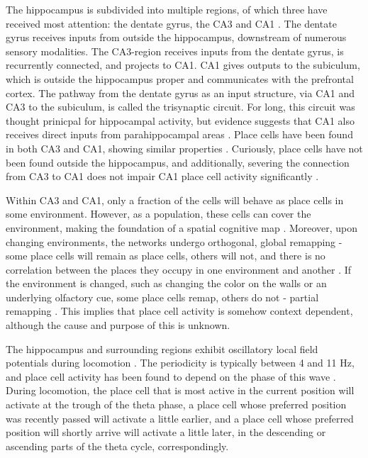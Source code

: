 \documentclass{article}
\begin{document}
    The hippocampus is subdivided into multiple regions, of which three have received most attention: the dentate gyrus, the CA3 and CA1 \parencite{Cherubini2015}. The dentate gyrus receives inputs from outside the hippocampus, downstream of numerous sensory modalities. The CA3-region receives inputs from the dentate gyrus, is recurrently connected, and projects to CA1. CA1 gives outputs to the subiculum, which is outside the hippocampus proper and communicates with the prefrontal cortex. The pathway from the dentate gyrus as an input structure, via CA1 and CA3 to the subiculum, is called the trisynaptic circuit. For long, this circuit was thought prinicpal for hippocampal activity, but evidence suggests that CA1 also receives direct inputs from parahippocampal areas \parencite{Kerr2007}. Place cells have been found in both CA3 and CA1, showing similar properties \parencite{Dong2021}. Curiously, place cells have not been found outside the hippocampus, and additionally, severing the connection from CA3 to CA1 does not impair CA1 place cell activity significantly \parencite{Brun2002}.

    Within CA3 and CA1, only a fraction of the cells will behave as place cells in some environment. However, as a population, these cells can cover the environment, making the foundation of a spatial cognitive map \parencite{Wilson1993}. Moreover, upon changing environments, the networks undergo orthogonal, global remapping - some place cells will remain as place cells, others will not, and there is no correlation between the places they occupy in one environment and another \parencite{Muller1987}. If the environment is changed, such as changing the color on the walls or an underlying olfactory cue, some place cells remap, others do not - partial remapping \parencite{Anderson2003}. This implies that place cell activity is somehow context dependent, although the cause and purpose of this is unknown.

    The hippocampus and surrounding regions exhibit oscillatory local field potentials during locomotion \parencite{Winson1978}. The periodicity is typically between 4 and 11 Hz, and place cell activity has been found to depend on the phase of this wave \parencite{OKeefe1993,Skaggs1996, Hafting2008}. During locomotion, the place cell that is most active in the current position will activate at the trough of the theta phase, a place cell whose preferred position was recently passed will activate a little earlier, and a place cell whose preferred position will shortly arrive will activate a little later, in the descending or ascending parts of the theta cycle, correspondingly.
\end{document}
